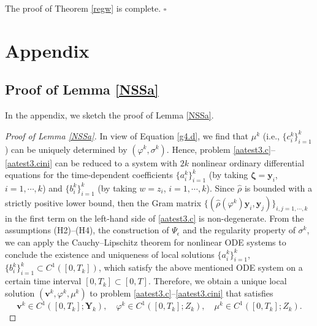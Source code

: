 \documentclass[11pt,reqno]{amsart}
\def\yy{\bm{y}}
\begin{document}
The proof of Theorem \ref{regw} is complete.
\hfill $\square$





\appendix

\section{Appendix}
\setcounter{equation}{0}
%
\subsection{Proof of Lemma \ref{NSSa}}
\label{appen-1}
In the appendix, we sketch the proof of Lemma \ref{NSSa}.

\begin{proof}[Proof of Lemma \ref{NSSa}] In view of Equation \eqref{g4.d}, we find that $\mu^k$ (i.e., $\{c_i^{k}\}_{i=1}^{k}$) can be uniquely determined by $(\varphi^k, \sigma^k)$. Hence, problem \eqref{aatest3.c}--\eqref{aatest3.cini} can be reduced to a system with $2k$ nonlinear ordinary differential equations for the time-dependent coefficients $\{a_{i}^{k}\}_{i=1}^{k}$ (by taking $\bm{\zeta}=\bm{y}_i$, $i=1,\cdots,k$) and $\{b_{i}^{k}\}_{i=1}^{k}$ (by taking $w=z_i$, $i=1,\cdots,k$). Since $\widehat{\rho}$ is bounded with a strictly positive lower bound, then the Gram matrix $\{(\widehat{\rho}(\varphi^k)\yy_i,\yy_j)\}_{i,j=1,\cdots,k}$ in the first term on the left-hand side of \eqref{aatest3.c} is non-degenerate. From the assumptions (H2)--(H4), the construction of $\Psi_\epsilon$  and the regularity property of $\sigma^k$, we can apply the Cauchy--Lipschitz theorem for nonlinear ODE systems to conclude the existence and uniqueness of local solutions $\{a_{i}^{k}\}_{i=1}^k$, $\{b_{i}^{k}\}_{i=1}^{k}\subset  C^1([0,T_k])$, which satisfy the above mentioned ODE system on a certain time interval $[0,T_k]\subset[0,T]$.
Therefore, we obtain a unique local solution $(\bm{v}^k,\varphi^k,\mu^k)$ to problem \eqref{aatest3.c}--\eqref{aatest3.cini} that satisfies
$$
\bm{v}^k\in C^1([0,T_{k}];\bm{Y}_{k}),
\quad
\varphi^k\in C^1([0,T_{k}];Z_{k}),
\quad
\mu^k\in C^1([0,T_{k}];Z_{k}).
$$


\end{proof}
\end{document}
